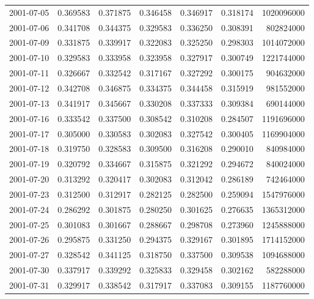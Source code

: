 \begin{tabular}{lrrrrrr}
2001-07-05 &    0.369583 &    0.371875 &    0.346458 &    0.346917 &    0.318174 &  1020096000 \\
2001-07-06 &    0.341708 &    0.344375 &    0.329583 &    0.336250 &    0.308391 &   802824000 \\
2001-07-09 &    0.331875 &    0.339917 &    0.322083 &    0.325250 &    0.298303 &  1014072000 \\
2001-07-10 &    0.329583 &    0.333958 &    0.323958 &    0.327917 &    0.300749 &  1221744000 \\
2001-07-11 &    0.326667 &    0.332542 &    0.317167 &    0.327292 &    0.300175 &   904632000 \\
2001-07-12 &    0.342708 &    0.346875 &    0.334375 &    0.344458 &    0.315919 &   981552000 \\
2001-07-13 &    0.341917 &    0.345667 &    0.330208 &    0.337333 &    0.309384 &   690144000 \\
2001-07-16 &    0.333542 &    0.337500 &    0.308542 &    0.310208 &    0.284507 &  1191696000 \\
2001-07-17 &    0.305000 &    0.330583 &    0.302083 &    0.327542 &    0.300405 &  1169904000 \\
2001-07-18 &    0.319750 &    0.328583 &    0.309500 &    0.316208 &    0.290010 &   840984000 \\
2001-07-19 &    0.320792 &    0.334667 &    0.315875 &    0.321292 &    0.294672 &   840024000 \\
2001-07-20 &    0.313292 &    0.320417 &    0.302083 &    0.312042 &    0.286189 &   742464000 \\
2001-07-23 &    0.312500 &    0.312917 &    0.282125 &    0.282500 &    0.259094 &  1547976000 \\
2001-07-24 &    0.286292 &    0.301875 &    0.280250 &    0.301625 &    0.276635 &  1365312000 \\
2001-07-25 &    0.301083 &    0.301667 &    0.288667 &    0.298708 &    0.273960 &  1245888000 \\
2001-07-26 &    0.295875 &    0.331250 &    0.294375 &    0.329167 &    0.301895 &  1714152000 \\
2001-07-27 &    0.328542 &    0.341125 &    0.318750 &    0.337500 &    0.309538 &  1094688000 \\
2001-07-30 &    0.337917 &    0.339292 &    0.325833 &    0.329458 &    0.302162 &   582288000 \\
2001-07-31 &    0.329917 &    0.338542 &    0.317917 &    0.337083 &    0.309155 &  1187760000 \\

\end{tabular}
